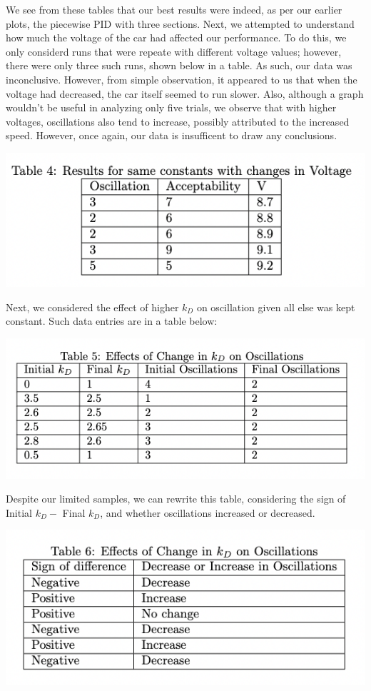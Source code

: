 \documentclass[12pt]{article}
\begin{document}
\begin{multicols}{2}
We see from these tables that our best results were indeed, as per our earlier plots, the piecewise PID with three sections. \newline
Next, we attempted to understand how much the voltage of the car had affected our performance. To do this, we only considerd runs that were repeate with different voltage values; however, there were only three such runs, shown below in a table.
As such, our data was inconclusive. However, from simple observation, it appeared to us that when the voltage had decreased, the car itself seemed to run slower. 
Also, although a graph wouldn't be useful in analyzing only five trials, we observe that with higher voltages, oscillations also tend to increase, possibly attributed to the increased speed. However, once again, our data is insufficent to draw any conclusions.
\begin{center}
    \includegraphics*[scale=0.5]{Table4.png}
\end{center}
Next, we considered the effect of higher $k_D$ on oscillation given all else was kept constant. Such data entries are in a table below:
\begin{center}
    \includegraphics*[scale=0.5]{Table5.png}
\end{center}
Despite our limited samples, we can rewrite this table, considering the sign of Initial $k_D -$ Final $k_D$, and whether oscillations increased or decreased. 

\begin{center}
    \includegraphics*[scale=0.5]{Table6.png}
\end{center}


\end{multicols}
\end{document}
